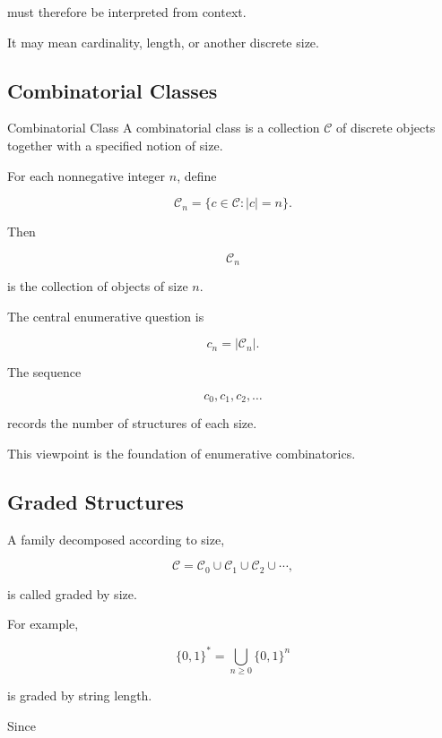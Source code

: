 must therefore be interpreted from context.

It may mean cardinality, length, or another discrete size.

\subsection{Combinatorial Classes}
\label{subsec:combinatorial-classes}

\begin{definitionbox}{Combinatorial Class}
A combinatorial class is a collection \(\mathcal{C}\) of discrete
objects together with a specified notion of size.
\end{definitionbox}

For each nonnegative integer \(n\), define

\[
\boxed{
\mathcal{C}_n
=
\{c\in\mathcal{C}:|c|=n\}.
}
\]

Then

\[
\mathcal{C}_n
\]

is the collection of objects of size \(n\).

The central enumerative question is

\[
\boxed{
c_n=|\mathcal{C}_n|.
}
\]

The sequence

\[
c_0,c_1,c_2,\ldots
\]

records the number of structures of each size.

This viewpoint is the foundation of enumerative combinatorics.

\subsection{Graded Structures}
\label{subsec:graded-structures}

A family decomposed according to size,

\[
\mathcal{C}
=
\mathcal{C}_0
\cup
\mathcal{C}_1
\cup
\mathcal{C}_2
\cup
\cdots,
\]

is called graded by size.

For example,

\[
\{0,1\}^{*}
=
\bigcup_{n\geq0}\{0,1\}^{n}
\]

is graded by string length.

Since

